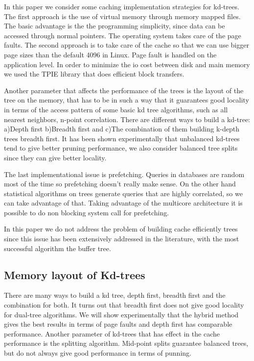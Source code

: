 \documentclass[12pt,letterpaper,doublespaced,ETD,dvips,proposal]{gtthesis}
\begin{document}
\begin{Body}
In this paper we consider some caching implementation strategies for
kd-trees. The first approach is the use of virtual memory through
memory mapped files. The basic advantage is the the programming
simplicity, since data can be accessed through normal pointers. The
operating system takes care of the page faults. The second approach
is to take care of the cache so that we can use bigger page sizes
than the default 4096 in Linux. Page fault is handled on the
application level. In order to minimize the io cost between disk and
main memory we used the TPIE library that does efficient block
transfers.

Another parameter that affects the performance of the trees is the
layout of the tree on the memory, that has to be in such a way that
it guarantees good locality in terms of the access pattern of some
basic kd tree algorithms, such as all  nearest neighbors, n-point
correlation. There are different ways to build a kd-tree: a)Depth
first b)Breadth first and c)The combination of them building k-depth
trees breadth first. It has been shown experimentally that
unbalanced kd-trees tend to give better pruning performance, we also
consider balanced tree splits since they can give better locality.

The last implementational issue is prefetching.  Queries in
databases are random most of the time so prefetching doesn't really
make sense. On the other hand statistical algorithms on trees
generate queries that are highly correlated, so we can take
advantage of that. Taking advantage of the multicore architecture it
is possible to do non blocking system call for prefetching.

In this paper we do not address the problem of building cache
efficiently trees since this issue has been extensively addressed in
the literature, with the most successful algorithm the buffer tree.

\subsection{Memory layout of Kd-trees} There are many ways to build a
kd tree, depth first, breadth first and the combination for both. It
turns out that breadth first does not give good locality for
dual-tree algorithms. We will show experimentally that the hybrid
method gives the best results in terms of page faults and depth
first has comparable performance. Another parameter of kd-trees that
has effect in the cache performance is the splitting algorithm.
Mid-point splits  guarantee balanced trees, but do not always give
good performance in terms of punning.


\end{Body}
\end{document}
